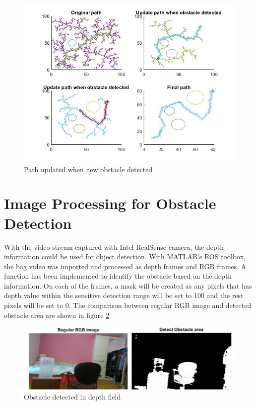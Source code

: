 \documentclass[
  oneside]{ubcthesis}
\begin{document}
\begin{figure}

{\centering \includegraphics[width=0.7\linewidth]{figures/2} 

}

\caption{Path updated when new obstacle detected}\label{fig:figure2}
\end{figure}



\hypertarget{image-processing-for-obstacle-detection}{%
\section{Image Processing for Obstacle Detection}\label{image-processing-for-obstacle-detection}}

With the video stream captured with Intel RealSense camera, the depth information could be used for object detection. With MATLAB's ROS toolbox, the bag video was imported and processed as depth frames and RGB frames. A function has been implemented to identify the obstacle based on the depth information. On each of the frames, a mask will be created as any pixels that has depth value within the sensitive detection range will be set to 100 and the rest pixels will be set to 0. The comparison between regular RGB image and detected obstacle area are shown in figure \ref{fig:figure3}

\begin{figure}

{\centering \includegraphics[width=0.8\linewidth]{figures/3} 

}

\caption{Obstacle detected in depth field}\label{fig:figure3}
\end{figure}
\end{document}
